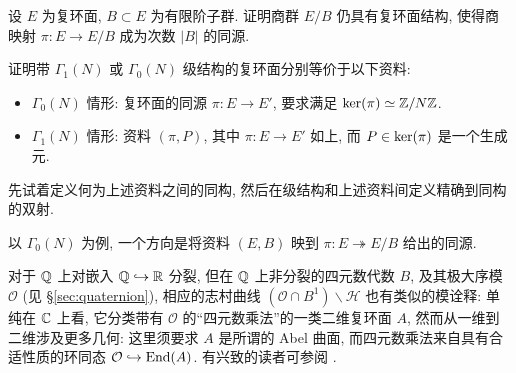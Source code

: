 \begin{exercise}
	设 $E$ 为复环面, $B \subset E$ 为有限阶子群. 证明商群 $E/B$ 仍具有复环面结构, 使得商映射 $\pi: E \to E/B$ 成为次数 $|B|$ 的同源.
\end{exercise}

\begin{exercise} 
	证明带 $\Gamma_1(N)$ 或 $\Gamma_0(N)$ 级结构的复环面分别等价于以下资料:
	\begin{itemize}
		\item $\Gamma_0(N)$ 情形: 复环面的同源 $\pi: E \to E'$, 要求满足 $\operatorname{ker}(\pi) \simeq \mathbb{Z}/N\mathbb{Z}$.
		\item $\Gamma_1(N)$ 情形: 资料 $(\pi, P)$, 其中 $\pi: E \to E'$ 如上, 而 $P \in \operatorname{ker}(\pi)$ 是一个生成元.
	\end{itemize}
	先试着定义何为上述资料之间的同构, 然后在级结构和上述资料间定义精确到同构的双射.
	
	\begin{hint}
		以 $\Gamma_0(N)$ 为例, 一个方向是将资料 $(E, B)$ 映到 $\pi: E \twoheadrightarrow E/B$ 给出的同源.
	\end{hint}
\end{exercise}

\begin{remark}
	对于 $\mathbb{Q}$ 上对嵌入 $\mathbb{Q} \hookrightarrow \mathbb{R}$ 分裂, 但在 $\mathbb{Q}$ 上非分裂的四元数代数 $B$, 及其极大序模 $\mathcal{O}$ (见 \S\ref{sec:quaternion}), 相应的志村曲线 $(\mathcal{O} \cap B^1) \backslash \mathcal{H}$ 也有类似的模诠释: 单纯在 $\mathbb{C}$ 上看, 它分类带有 $\mathcal{O}$ 的``四元数乘法''的一类二维复环面 $A$, 然而从一维到二维涉及更多几何: 这里须要求 $A$ 是所谓的 Abel 曲面, 而四元数乘法来自具有合适性质的环同态 $\mathcal{O} \hookrightarrow \operatorname{End}(A)$. 有兴致的读者可参阅 \cite[\S 43]{Voi}.
\end{remark}
